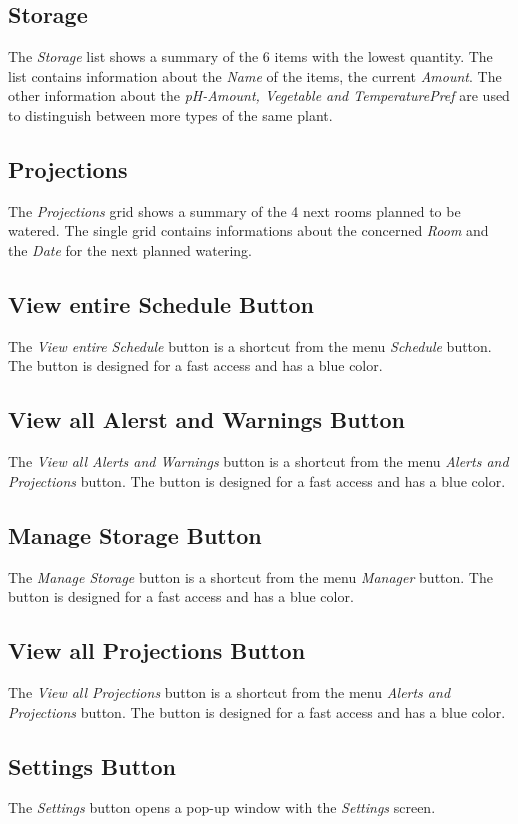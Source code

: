 \subsection{Storage}
The \emph{Storage} list shows a summary of the 6 items with the lowest quantity.
The list contains information about the \emph{Name} of the items, the current
\emph{Amount}. The other information about the \emph{pH-Amount, Vegetable and
TemperaturePref} are used to distinguish between more types of the same plant.

\subsection{Projections}
The \emph{Projections} grid shows a summary of the 4 next rooms planned
to be watered. The single grid contains informations about the concerned
\emph{Room} and the \emph{Date} for the next planned watering.

\subsection{View entire Schedule Button}
The \emph{View entire Schedule} button is a shortcut from the menu
\emph{Schedule} button. The button is designed for a fast access and has a blue
color.

\subsection{View all Alerst and Warnings Button}
The \emph{View all Alerts and Warnings} button is a shortcut from the menu
\emph{Alerts and Projections} button. The button is designed for a fast access
and has a blue color.

\subsection{Manage Storage Button}
The \emph{Manage Storage} button is a shortcut from the menu
\emph{Manager} button. The button is designed for a fast access and has a blue
color.

\subsection{View all Projections Button}
The \emph{View all Projections} button is a shortcut from the menu
\emph{Alerts and Projections} button. The button is designed for a fast access
and has a blue color.

\subsection{Settings Button}
The \emph{Settings} button opens a pop-up window with the \emph{Settings}
screen.

